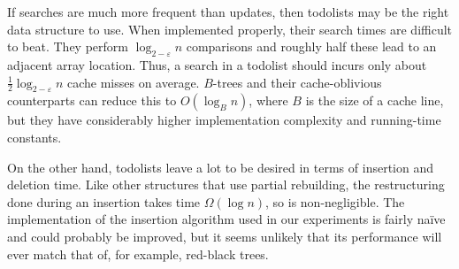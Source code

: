 \documentclass{patmorin}
\newcommand{\eps}{\varepsilon}
\begin{document}
If searches are much more frequent than updates, then todolists may
be the right data structure to use.  When implemented properly, their
search times are difficult to beat.  They perform $\log_{2-\eps}
n$ comparisons and roughly half these lead to an adjacent array
location. Thus, a search in a todolist should incurs only about
$\frac{1}{2}\log_{2-\eps} n$ cache misses on average.   $B$-trees
\cite{bayer.mccreight:organization} and their cache-oblivious counterparts
\cite{bender.demaine.ea:cache-oblivious,bender.duan.ea:locality-preserving}
can reduce this to $O(\log_B n)$, where $B$ is the size of a cache line,
but they have considerably higher implementation complexity and running-time
constants.

On the other hand, todolists leave a lot to be desired in terms of
insertion and deletion time.  Like other structures that use partial
rebuilding, the restructuring done during an insertion takes time
$\Omega(\log n)$, so is non-negligible.  The implementation of the
insertion algorithm used in our experiments is fairly naïve and could
probably be improved, but it seems unlikely that its performance will
ever match that of, for example, red-black trees.





\end{document}
